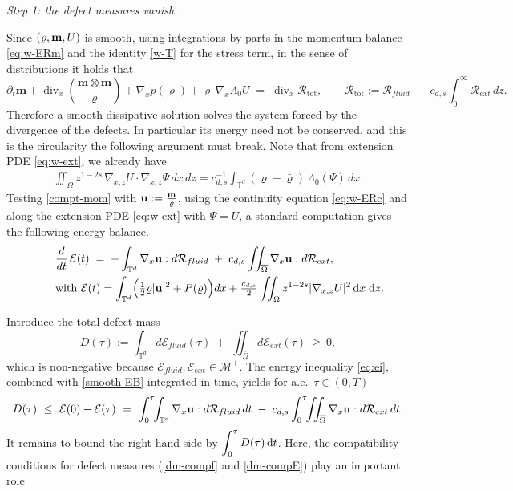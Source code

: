 \documentclass[12pt,a4paper,twoside]{article}
\newcommand{\Div}{\operatorname{div}}
\newcommand{\vr}{\varrho}
\newcommand{\vu}{\vc{u}}
\newcommand{\vc}[1]{{\bf #1}}
\newcommand{\Grad}{\nabla}
\newcommand{\dx}{{\,\rm d} {x}}
\newcommand{\dt}{{\,\rm d} t }
\numberwithin{equation}{section}%
\newcommand{\vm}{\vc{m}}
\begin{document}
\begin{pf}
	\emph{Step 1: the defect measures vanish.}
	
	Since $(\vr,\vm,U)$ is smooth, using integrations by parts in the momentum balance \eqref{eq:w-ERm} and the identity \eqref{w-T} for the stress term, in the sense of distributions it holds that 
	\begin{equation}\label{compt-mom}
		\partial_t \mathbf m + \Div_x\!\left( \frac{\mathbf m\otimes\mathbf m}{\vr} \right) + \Grad_x p(\vr) + \vr\,\Grad_x \Lambda_0 U
		\;=\; \Div_x \mathcal R_{\mathrm{tot}},
		\qquad
		\mathcal R_{\mathrm{tot}} := \mathcal R_{fluid} \;-\; c_{d,s}\!\int_0^\infty \mathcal R_{ext}\,dz.
	\end{equation}
 Therefore a smooth dissipative solution solves the system forced by the divergence of the defects. In particular its energy need not be conserved, and this is the circularity the following argument must break. %
	Note that from extension PDE \eqref{eq:w-ext}, we already have  
	\begin{align*}
			\iint_{\Omega} z^{1-2s}\, \Grad_{x,z} U \cdot \Grad_{x,z} \Psi \,dx\,dz = c_{d,s}^{-1} \int_{\mathbb{T}^d} (\vr - \bar{\vr})\, \Lambda_0(\Psi) \,dx.
	\end{align*}
	Testing \eqref{compt-mom} with $\vu:=\tfrac{\vm}{\vr}$, using the continuity equation \eqref{eq:w-ERc} and along the extension PDE \eqref{eq:w-ext} with $ \Psi=U$, a standard computation gives the following energy balance.
	\begin{align}\label{smooth-EB}
		\begin{split}
		&	\frac{d}{dt}\,\mathcal E(t)
		\;=\; -\int_{\mathbb T^d} \Grad_x\vu : d\mathcal R_{fluid}
		\;+\; c_{d,s}\iint_{\overline\Omega} \Grad_x\vu : d\mathcal R_{ext},\\
		\qquad
	& \text{with }	\mathcal E(t) = \int_{\mathbb T^d}\!\Big(\tfrac12\vr|\vu|^2 + P(\vr)\Big)dx + \tfrac{c_{d,s}}{2}\iint_\Omega z^{1-2s}|\Grad_{x,z}U|^2 \dx\;  \text{d}z.
	\end{split}
	\end{align}

	Introduce the total defect mass
	\begin{equation}\label{D-def}
		D(\tau) := \int_{\mathbb T^d} d\mathcal E_{fluid}(\tau) \;+\; \iint_{\overline\Omega} d\mathcal E_{ext}(\tau) \ \ge\ 0 ,
	\end{equation}
	which is non-negative because $\mathcal E_{fluid}, \mathcal E_{ext} \in \mathcal M^+$. The energy inequality \eqref{eq:ei}, combined with \eqref{smooth-EB} integrated in time, yields for a.e.\ $\tau\in(0,T)$
	\begin{equation}\label{D-bound}
		D(\tau)
		\ \le\ \mathcal E(0) - \mathcal E(\tau)
		\ =\ \int_0^\tau\!\!\int_{\mathbb T^d} \Grad_x\vu : d\mathcal R_{fluid}\,dt
		\;-\; c_{d,s}\int_0^\tau\!\!\iint_{\overline\Omega} \Grad_x\vu : d\mathcal R_{ext}\,dt .
	\end{equation}
	It remains to bound the right-hand side by $\displaystyle \int_0^\tau D(\tau) \dt $. Here, the compatibility conditions for defect measures (\eqref{dm-compf} and \eqref{dm-compE}) play an important role
	

\end{pf}
\end{document}
